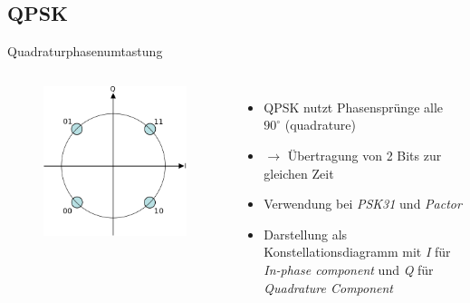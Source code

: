 \subsection{QPSK}
\begin{frame}{Quadraturphasenumtastung}
  \begin{columns}
    \begin{figure}
      \includegraphics[width=\textwidth,height=.7\textheight,keepaspectratio]{a15/QPSK_Gray_Coded.png}
    \end{figure}
    \begin{itemize}
      \item QPSK nutzt Phasensprünge alle $90^\circ$ (quadrature)
      \item $\rightarrow$ Übertragung von 2 Bits zur gleichen Zeit
      \item Verwendung bei \emph{PSK31} und \emph{Pactor}
      \item Darstellung als Konstellationsdiagramm mit \emph{I} für \emph{In-phase component} und \emph{Q} für \emph{Quadrature Component}
    \end{itemize}
  \end{columns}
\end{frame}

